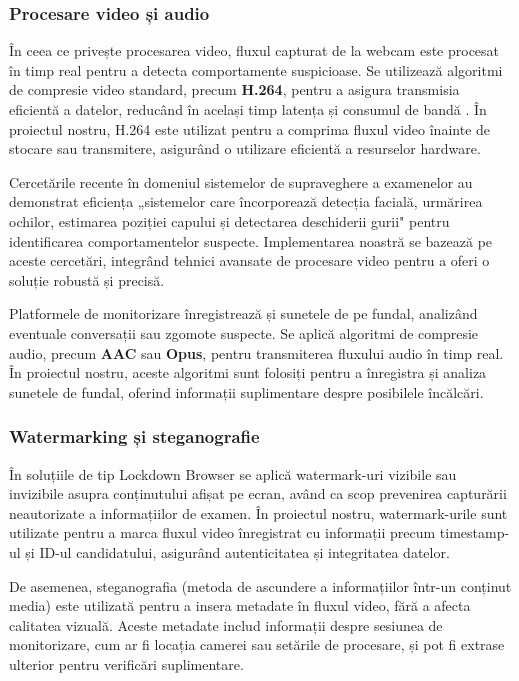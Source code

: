 \documentclass[12pt,a4paper]{article}
\begin{document}
\subsubsection{Procesare video și audio}
În ceea ce privește procesarea video, fluxul capturat de la webcam este procesat în
timp real pentru a detecta comportamente suspicioase. Se utilizează algoritmi de
compresie video standard, precum \textbf{H.264}, pentru a asigura transmisia
eficientă a datelor, reducând în același timp latența și consumul de
bandă \cite{academic3}. În proiectul nostru, H.264 este utilizat pentru a comprima fluxul video înainte de stocare sau transmitere, asigurând o utilizare eficientă a resurselor hardware.

Cercetările recente în domeniul sistemelor de supraveghere a examenelor au demonstrat eficiența 
„sistemelor care încorporează detecția facială, urmărirea ochilor, estimarea poziției capului și 
detectarea deschiderii gurii" \cite{face_tracking_research} pentru identificarea comportamentelor suspecte. 
Implementarea noastră se bazează pe aceste cercetări, integrând tehnici avansate de procesare video 
pentru a oferi o soluție robustă și precisă.

Platformele de monitorizare înregistrează și sunetele de pe fundal, analizând 
eventuale conversații sau zgomote suspecte. Se aplică algoritmi de compresie audio, 
precum \textbf{AAC} sau \textbf{Opus}, pentru transmiterea fluxului audio în timp real. În proiectul nostru, aceste algoritmi sunt folosiți pentru a înregistra și analiza sunetele de fundal, oferind informații suplimentare despre posibilele încălcări.

\subsubsection{Watermarking și steganografie}
În soluțiile de tip Lockdown Browser se aplică watermark-uri vizibile sau invizibile 
asupra conținutului afișat pe ecran, având ca scop prevenirea capturării neautorizate 
a informațiilor de examen. În proiectul nostru, watermark-urile sunt utilizate pentru a marca fluxul video înregistrat cu informații precum timestamp-ul și ID-ul candidatului, asigurând autenticitatea și integritatea datelor.

De asemenea, steganografia (metoda de ascundere a informațiilor 
într-un conținut media) este utilizată pentru a insera metadate în fluxul video, fără a afecta calitatea vizuală. Aceste metadate includ informații despre sesiunea de monitorizare, cum ar fi locația camerei sau setările de procesare, și pot fi extrase ulterior pentru verificări suplimentare.
\end{document}
